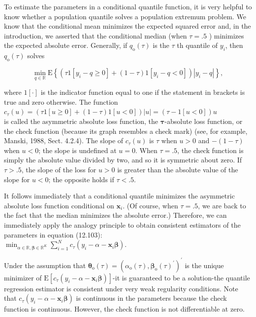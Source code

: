 \documentclass[10pt]{article}
\begin{document}
To estimate the parameters in a conditional quantile function, it is very helpful to know whether a population quantile solves a population extremum problem. We know that the conditional mean minimizes the expected squared error and, in the introduction, we asserted that the conditional median (when $\tau=.5$ ) minimizes the expected absolute error. Generally, if $q_{\mathrm{o}}(\tau)$ is the $\tau$ th quantile of $y_{i}$, then $q_{\mathrm{o}}(\tau)$ solves


\begin{equation*}
\min _{q \in \mathbb{R}} \mathrm{E}\left\{\left(\tau 1\left[y_{i}-q \geq 0\right]+(1-\tau) 1\left[y_{i}-q<0\right]\right)\left|y_{i}-q\right|\right\}, \tag{12.104}
\end{equation*}


where $1[\cdot]$ is the indicator function equal to one if the statement in brackets is true and zero otherwise. The function\\
$c_{\tau}(u)=(\tau 1[u \geq 0]+(1-\tau) 1[u<0])|u|=(\tau-1[u<0]) u$\\
is called the asymmetric absolute loss function, the $\boldsymbol{\tau}$-absolute loss function, or the check function (because its graph resembles a check mark) (see, for example, Manski, 1988, Sect. 4.2.4). The slope of $c_{\tau}(u)$ is $\tau$ when $u>0$ and $-(1-\tau)$ when $u<0$; the slope is undefined at $u=0$. When $\tau=.5$, the check function is simply the absolute value divided by two, and so it is symmetric about zero. If $\tau>.5$, the slope of the loss for $u>0$ is greater than the absolute value of the slope for $u<0$; the opposite holds if $\tau<.5$.

It follows immediately that a conditional quantile minimizes the asymmetric absolute loss function conditional on $\mathbf{x}_{i}$. (Of course, when $\tau=.5$, we are back to the fact that the median minimizes the absolute error.) Therefore, we can immediately apply the analogy principle to obtain consistent estimators of the parameters in equation (12.103):\\
$\min _{\alpha \in \mathbb{R}, \boldsymbol{\beta} \in \mathbb{R}^{K}} \sum_{i=1}^{N} c_{\tau}\left(y_{i}-\alpha-\mathbf{x}_{i} \boldsymbol{\beta}\right)$.

Under the assumption that $\boldsymbol{\theta}_{\mathrm{o}}(\tau)=\left(\alpha_{\mathrm{o}}(\tau), \boldsymbol{\beta}_{\mathrm{o}}(\tau)^{\prime}\right)^{\prime}$ is the unique minimizer of $\mathrm{E}\left[c_{\tau}\left(y_{i}-\alpha-\mathbf{x}_{i} \boldsymbol{\beta}\right)\right]$-it is guaranteed to be a solution-the quantile regression estimator is consistent under very weak regularity conditions. Note that $c_{\tau}\left(y_{i}-\alpha-\mathbf{x}_{i} \boldsymbol{\beta}\right)$ is continuous in the parameters because the check function is continuous. However, the check function is not differentiable at zero.
\end{document}
